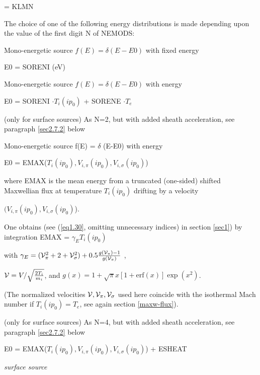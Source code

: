 \begin{list}{ }{}
\item[{\bf NEMODS }]
= KLMN

The choice of one of the following energy distributions is
made depending upon the value of the first digit N of NEMODS:
\begin{list}{ }{}
\item[{N = 1 }]
Mono-energetic source $f(E) = \delta (E-E0)$ with fixed energy

E0 = SORENI (eV)
\item[{N = 2 }]
Mono-energetic source $f(E) = \delta (E-E0)$ with energy

E0 = SORENI $\cdot T_i(ip_0) $ + SORENE $\cdot T_e $

\item[{N = 3 }]
(only for surface sources)
As N=2, but with added sheath acceleration, see paragraph \ref{sec2.7.2} below


\item[{N = 4 }]
Mono-energetic source f(E) = $\delta$ (E-E0) with energy

E0 = EMAX($T_i(ip_0) ,V_{i,\pi}(ip_0) ,V_{i,\sigma}(ip_0)$)

where EMAX is the mean energy from a truncated (one-sided) shifted Maxwellian flux
at temperature $T_i(ip_0)$ drifting by a velocity

$(V_{i,\pi}(ip_0), V_{i,\sigma}(ip_0)$).

One obtains (see (\ref{eq1.30}, omitting unnecessary indices) in section \ref{sec1}) by integration EMAX = $\gamma_E   T_i(ip_0) $

with $\gamma_E   =   (
{\cal V}_{\pi}^2  +   2   +  {\cal V}_{\sigma}^ 2   )   +   0.5
\frac{g({\cal V}_{\pi} ) - 1}{g ({\cal V}_{\pi} )}$ ,

${\cal V}   = V / \sqrt{ \frac{{2 T_i}}{{m_i}} }$, and $g(x)   =   1 +
\sqrt{\pi} x  [ 1 + \mbox{erf}(x) ]   \exp(x^2 )$.

(The normalized velocities ${\cal V}, {\cal V}_{\pi}, {\cal V}_{\sigma}$ used here coincide with the
isothermal Mach number if $T_i(ip_0) = T_e$, see again section \ref{maxw-flux}).
\item[{N = 5 }]
(only for surface sources)
As N=4, but with added sheath acceleration, see paragraph \ref{sec2.7.2} below

E0 = EMAX($T_i(ip_0) ,V_{i,\pi}(ip_0) ,V_{i,\sigma}(ip_0)$) +
ESHEAT
\item[{N = 6 }]

\emph{surface source}


\end{list}
\end{list}
